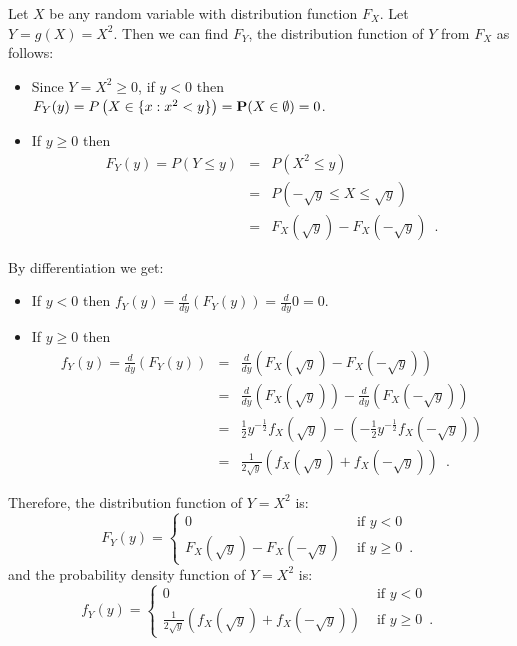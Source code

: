 \begin{example}
Let $X$ be any random variable with distribution function $F_X$.  Let $Y=g(X)=X^2$.  
Then we can find $F_Y$, the distribution function of $Y$ from $F_X$ as follows:
\begin{itemize}
\item {Since $Y=X^2 \geq 0$, if $y < 0$ then $F_Y(y) = P\left( X \in \{ x : x^2 < y\} \right) = \mathbf{P}(X \in \emptyset) = 0$.}
\item {If $y \geq 0$ then
\begin{eqnarray*}
F_Y(y) = P \left(Y \leq y \right) 
&=& P \left( X^2 \leq y \right) \\
&=& P \left( -\sqrt{y} \leq X \leq \sqrt{y} \right) \\
&=& F_X(\sqrt{y}) - F_X(-\sqrt{y}) \enspace .
\end{eqnarray*}
}
\end{itemize}
By differentiation we get:
\begin{itemize}
\item {If $y<0$ then $f_Y(y)=\frac{d}{dy}(F_Y(y)) = \frac{d}{dy} 0 = 0$.}
\item {If $y \geq 0$ then
\begin{eqnarray*}
f_Y(y) 
= \frac{d}{dy}\left( F_Y(y) \right) 
&=& \frac{d}{dy}\left( F_X(\sqrt{y}) - F_X( - \sqrt{y}) \right)\\
&=& \frac{d}{dy}\left( F_X(\sqrt{y}) \right) - \frac{d}{dy}\left( F_X( - \sqrt{y}) \right)\\
&=& \frac{1}{2}y^{-\frac{1}{2}} f_X(\sqrt{y}) - \left( -\frac{1}{2}y^{-\frac{1}{2}} f_X( - \sqrt{y}) \right)\\
&=& \frac{1}{2 \sqrt{y}} \left( f_X(\sqrt{y}) + f_X( - \sqrt{y}) \right) \enspace .
\end{eqnarray*}
}
\end{itemize}
Therefore, the distribution function of $Y=X^2$ is:
\begin{equation}\label{E:F_YofX^2}
F_Y(y) = 
\begin{cases}
0 & \text{ if } y < 0 \\
F_X(\sqrt{y}) - F_X(-\sqrt{y}) & \text{ if } y \geq 0 \enspace .
\end{cases}
\end{equation}
and the probability density function of $Y=X^2$ is:
\begin{equation}\label{E:f_YofX^2}
f_Y(y) = 
\begin{cases}
0 & \text{ if } y < 0 \\
\frac{1}{2 \sqrt{y}} \left( f_X(\sqrt{y}) + f_X( - \sqrt{y}) \right) & \text{ if } y \geq 0 \enspace .
\end{cases}
\end{equation}
\end{example} 

